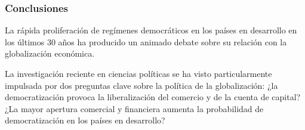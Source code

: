 \documentclass{beamer}
\begin{document}
\begin{frame}
\frametitle{Conclusiones}
La rápida proliferación de regímenes democráticos en los países en desarrollo en los últimos 30 años ha producido un animado debate sobre su relación con la globalización económica.

La investigación reciente en ciencias políticas se ha visto particularmente impulsada por dos preguntas clave sobre la política de la globalización: ¿la democratización provoca la liberalización del comercio y de la cuenta de capital? ¿La mayor apertura comercial y financiera aumenta la probabilidad de democratización en los países en desarrollo?

\end{frame}
\end{document}
